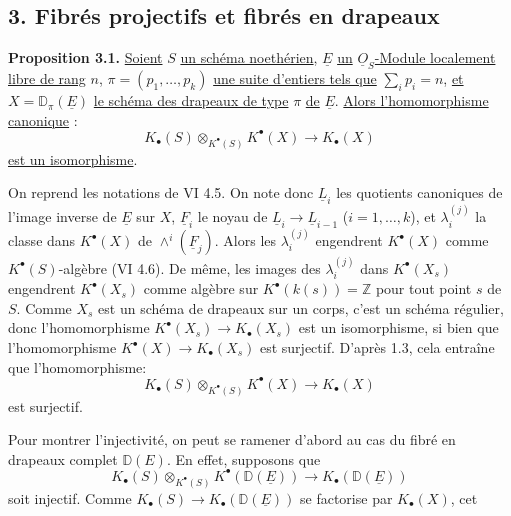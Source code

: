 
\subsection*{3. Fibrés projectifs et fibrés en drapeaux}

\textbf{Proposition 3.1.} \uline{Soient} $S$ \uline{un schéma noethérien}, $\underline{E}$ \uline{un} $\underline{O}_S$\uline{-Module localement libre de rang} $n$, $\pi=(p_1,\ldots,p_k)$ \uline{une suite d'entiers tels que} $\sum_i p_i=n$, \uline{et} $X=\mathbb D_\pi(\underline{E})$ \uline{le schéma des drapeaux de type} $\pi$ \uline{de} $\underline{E}$. \uline{Alors l'homomorphisme canonique} :
\[
K_\bullet(S)\otimes_{K^{\bullet}(S)}K^{\bullet}(X)\longrightarrow K_\bullet(X)
\]
\uline{est un isomorphisme}.

On reprend les notations de VI 4.5. On note donc $\underline{L}_i$ les quotients canoniques de l'image inverse de $\underline{E}$ sur $X$, $\underline{F}_i$ le noyau de $\underline{L}_i\to \underline{L}_{i-1}$ ($i=1,\ldots,k$), et $\lambda_i^{(j)}$ la classe dans $K^{\bullet}(X)$ de $\wedge^i(\underline{F}_j)$. Alors les $\lambda_i^{(j)}$ engendrent $K^{\bullet}(X)$ comme $K^{\bullet}(S)$-algèbre (VI 4.6). De même, les images des $\lambda_i^{(j)}$ dans $K^{\bullet}(X_s)$ engendrent $K^{\bullet}(X_s)$ comme algèbre sur $K^{\bullet}(k(s))=\mathbb Z$ pour tout point $s$ de $S$. Comme $X_s$ est un schéma de drapeaux sur un corps, c'est un schéma régulier, donc l'homomorphisme $K^{\bullet}(X_s)\to K_\bullet(X_s)$ est un isomorphisme, si bien que l'homomorphisme $K^{\bullet}(X)\to K_\bullet(X_s)$ est surjectif. D'après 1.3, cela entraîne que l'homomorphisme:
\[
K_\bullet(S)\otimes_{K^{\bullet}(S)}K^{\bullet}(X)\longrightarrow K_\bullet(X)
\]
est surjectif.

Pour montrer l'injectivité, on peut se ramener d'abord au cas du fibré en drapeaux complet $\mathbb D(E)$. En effet, supposons que
\[
K_\bullet(S)\otimes_{K^{\bullet}(S)}K^{\bullet}(\mathbb D(\underline{E}))\longrightarrow K_\bullet(\mathbb D(\underline{E}))
\]
soit injectif. Comme $K_\bullet(S)\to K_\bullet(\mathbb D(\underline{E}))$ se factorise par $K_\bullet(X)$, cet
